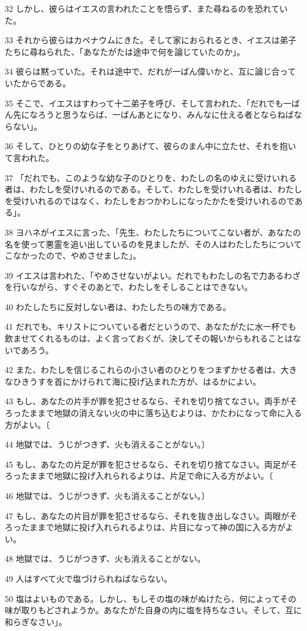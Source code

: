 \par 32 しかし、彼らはイエスの言われたことを悟らず、また尋ねるのを恐れていた。
\par 33 それから彼らはカペナウムにきた。そして家におられるとき、イエスは弟子たちに尋ねられた、「あなたがたは途中で何を論じていたのか」。
\par 34 彼らは黙っていた。それは途中で、だれが一ばん偉いかと、互に論じ合っていたからである。
\par 35 そこで、イエスはすわって十二弟子を呼び、そして言われた、「だれでも一ばん先になろうと思うならば、一ばんあとになり、みんなに仕える者とならねばならない」。
\par 36 そして、ひとりの幼な子をとりあげて、彼らのまん中に立たせ、それを抱いて言われた。
\par 37 「だれでも、このような幼な子のひとりを、わたしの名のゆえに受けいれる者は、わたしを受けいれるのである。そして、わたしを受けいれる者は、わたしを受けいれるのではなく、わたしをおつかわしになったかたを受けいれるのである」。
\par 38 ヨハネがイエスに言った、「先生、わたしたちについてこない者が、あなたの名を使って悪霊を追い出しているのを見ましたが、その人はわたしたちについてこなかったので、やめさせました」。
\par 39 イエスは言われた、「やめさせないがよい。だれでもわたしの名で力あるわざを行いながら、すぐそのあとで、わたしをそしることはできない。
\par 40 わたしたちに反対しない者は、わたしたちの味方である。
\par 41 だれでも、キリストについている者だというので、あなたがたに水一杯でも飲ませてくれるものは、よく言っておくが、決してその報いからもれることはないであろう。
\par 42 また、わたしを信じるこれらの小さい者のひとりをつまずかせる者は、大きなひきうすを首にかけられて海に投げ込まれた方が、はるかによい。
\par 43 もし、あなたの片手が罪を犯させるなら、それを切り捨てなさい。両手がそろったままで地獄の消えない火の中に落ち込むよりは、かたわになって命に入る方がよい。〔
\par 44 地獄では、うじがつきず、火も消えることがない。〕
\par 45 もし、あなたの片足が罪を犯させるなら、それを切り捨てなさい。両足がそろったままで地獄に投げ入れられるよりは、片足で命に入る方がよい。〔
\par 46 地獄では、うじがつきず、火も消えることがない。〕
\par 47 もし、あなたの片目が罪を犯させるなら、それを抜き出しなさい。両眼がそろったままで地獄に投げ入れられるよりは、片目になって神の国に入る方がよい。
\par 48 地獄では、うじがつきず、火も消えることがない。
\par 49 人はすべて火で塩づけられねばならない。
\par 50 塩はよいものである。しかし、もしその塩の味がぬけたら、何によってその味が取りもどされようか。あなたがた自身の内に塩を持ちなさい。そして、互に和らぎなさい」。

